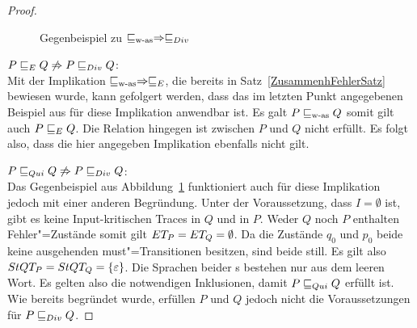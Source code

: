 \begin{proof}
  \begin{figure}[htbp]
    \begin{center}
      \caption{Gegenbeispiel zu $\sqsubseteq _{\mathrm{w}\text{-}\mathrm{as}} \Rightarrow  \sqsubseteq  _{Div}$}
      \label{wasDivGegenBsp}
    \end{center}
  \end{figure}

  $P  \sqsubseteq  _E Q \not\Rightarrow P  \sqsubseteq  _{Div} Q$:\\
  Mit der Implikation $\sqsubseteq _{\mathrm{w}\text{-}\mathrm{as}} \Rightarrow  \sqsubseteq  _E$, die bereits in
  Satz~\ref{ZusammenhFehlerSatz} bewiesen wurde, kann gefolgert werden, dass
  das im letzten Punkt angegebenen Beispiel aus für diese Implikation anwendbar
  ist. Es galt $P \sqsubseteq _{\mathrm{w}\text{-}\mathrm{as}} Q$ somit gilt auch $P  \sqsubseteq  _E Q$. Die Relation \DRel{}
  hingegen ist zwischen $P$ und $Q$ nicht erfüllt. Es folgt also, dass die hier
  angegeben Implikation ebenfalls nicht gilt.

  $P  \sqsubseteq  _{Qui} Q \not\Rightarrow P  \sqsubseteq  _{Div} Q$:\\
  Das Gegenbeispiel aus Abbildung~\ref{wasDivGegenBsp} funktioniert auch für
  diese Implikation jedoch mit einer anderen Begründung. Unter der
  Voraussetzung, dass $I=\emptyset$ ist, gibt es keine Input-kritischen Traces
  in $Q$ und in $P$. Weder $Q$ noch $P$ enthalten Fehler"=Zustände somit gilt
  $ET _P = ET _Q = \emptyset$. Da die Zustände $q_0$ und $p_0$ beide keine
  ausgehenden must"=Transitionen besitzen, sind beide still. Es gilt also
  $StQT _P = StQT _Q = \{\varepsilon\}$. Die Sprachen beider \MEIO{}s
  bestehen nur aus dem leeren Wort. Es gelten also die notwendigen
  Inklusionen, damit $P  \sqsubseteq  _{Qui} Q$ erfüllt ist. Wie bereits begründet wurde,
  erfüllen $P$ und $Q$ jedoch nicht die Voraussetzungen für $P  \sqsubseteq  _{Div} Q$.


\end{proof}
